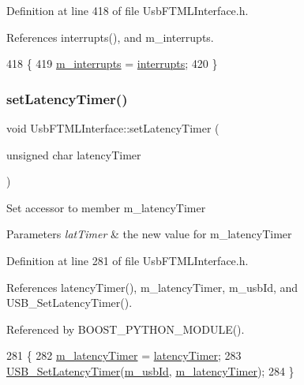 Definition at line 418 of file Usb\+F\+T\+M\+L\+Interface.\+h.



References interrupts(), and m\+\_\+interrupts.


\begin{DoxyCode}
418                                        \{
419     \hyperlink{classUsbFTMLInterface_adb6a6a61e78d9b489e6ecefd5752d5ad}{m\_interrupts} = \hyperlink{classUsbFTMLInterface_afab1c2175bd2bca261ffa2b8ee67df2d}{interrupts};
420   \}
\end{DoxyCode}
\mbox{\label{classUsbFTMLInterface_a3625ccc604bbf5e707b3f5d91bc8f1bb}} 
\subsubsection{\texorpdfstring{set\+Latency\+Timer()}{setLatencyTimer()}}
{\footnotesize\ttfamily void Usb\+F\+T\+M\+L\+Interface\+::set\+Latency\+Timer (\begin{DoxyParamCaption}\item[{unsigned char}]{latency\+Timer }\end{DoxyParamCaption})\hspace{0.3cm}{\ttfamily [inline]}}

Set accessor to member m\+\_\+latency\+Timer 
\begin{DoxyParams}{Parameters}
{\em lat\+Timer} & the new value for m\+\_\+latency\+Timer \\
\hline
\end{DoxyParams}


Definition at line 281 of file Usb\+F\+T\+M\+L\+Interface.\+h.



References latency\+Timer(), m\+\_\+latency\+Timer, m\+\_\+usb\+Id, and U\+S\+B\+\_\+\+Set\+Latency\+Timer().



Referenced by B\+O\+O\+S\+T\+\_\+\+P\+Y\+T\+H\+O\+N\+\_\+\+M\+O\+D\+U\+L\+E().


\begin{DoxyCode}
281                                                     \{
282     \hyperlink{classUsbFTMLInterface_a28342ea2c00af670f1376aaa36ad0236}{m\_latencyTimer} = \hyperlink{classUsbFTMLInterface_ac94dcd155b2e060d5fe04ccfbbb4de8d}{latencyTimer};
283     \hyperlink{LALUsbML_8h_a1a6965b64c7de773855cbdeaf2a62a27}{USB\_SetLatencyTimer}(\hyperlink{classUsbFTMLInterface_aab6754587c303660d5c498ce34a2b4c8}{m\_usbId}, \hyperlink{classUsbFTMLInterface_a28342ea2c00af670f1376aaa36ad0236}{m\_latencyTimer});
284   \}
\end{DoxyCode}
\mbox{\label{classUsbFTMLInterface_a3a0a9d323631790c2db210fdcc85e89b}} 
